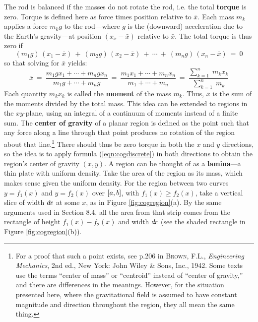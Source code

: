The rod is balanced if the masses do not rotate the rod, i.e. the total
\textbf{torque} is zero. Torque is defined here as force times position relative
to $\bar{x}$. Each mass $m_k$ applies a force $m_kg$ to the rod---where $g$ is
the (downward) acceleration due to the Earth's gravity---at position
$(x_x-\bar{x})$ relative to $\bar{x}$. The total torque is thus zero if
\[
(m_1g)\,(x_1-\bar{x}) ~+~ (m_2g)\,(x_2-\bar{x}) ~+~ \cdots ~+~
(m_ng)\,(x_n-\bar{x}) ~=~ 0
\]
so that solving for $\bar{x}$ yields:
\begin{equation}\label{eqn:cogdiscrete}
\bar{x} ~=~ \frac{m_1gx_1 + \cdots +  m_ngx_n}{m_1g + \cdots + m_ng} ~=~
            \frac{m_1x_1 + \cdots + m_nx_n}{m_1 + \cdots + m_n} ~=~
            \frac{\sum_{k=1}^n \;m_kx_k}{\sum_{k=1}^n \;m_k}
\end{equation}
Each quantity $m_kx_k$ is called the \textbf{moment} of the mass $m_k$. Thus,
$\bar{x}$ is the sum of the moments divided by the total mass. This idea can be
extended to regions in the $xy$-plane, using an integral of a continuum of
moments instead of a finite sum. The \textbf{center of gravity} of a
planar region is defined as the point such that any force along a line through
that point produces no rotation of the region about that line.\footnote{For a
proof that such a point exists, see p.206 in \textsc{Brown, F.L.},
\emph{Engineering Mechanics}, 2nd ed., New York: John Wiley \& Sons, Inc., 1942.
Some texts use the terms ``center of mass'' or ``centroid'' instead of ``center
of gravity,'' and there are differences in the meanings. However, for the
situation presented here, where the gravitational field is assumed to have
constant magnitude and direction throughout the region, they all mean the same
thing.} There should thus be zero torque in both the $x$ and $y$ directions, so
the idea is to apply formula (\ref{eqn:cogdiscrete}) in both directions
to obtain the region's center of gravity $(\bar{x},\bar{y})$.
\newpage
A region can be thought of as a \textbf{lamina}---a thin plate with uniform
density. Take the area of the region as its mass, which makes sense
given the uniform density. For the region between two curves
$y=f_1(x)$ and $y=f_2(x)$ over $\lbrack a,b \rbrack$, with $f_1(x) \ge f_2(x)$, take a
vertical slice of width $d\!x$ at some $x$, as in Figure \ref{fig:cogregion}(a).
By the same arguments used in Section 8.4, all the area from that strip comes
from the rectangle of height $f_1(x)-f_2(x)$ and width $d\!x$ (see the shaded
rectangle in Figure \ref{fig:cogregion}(b)).

